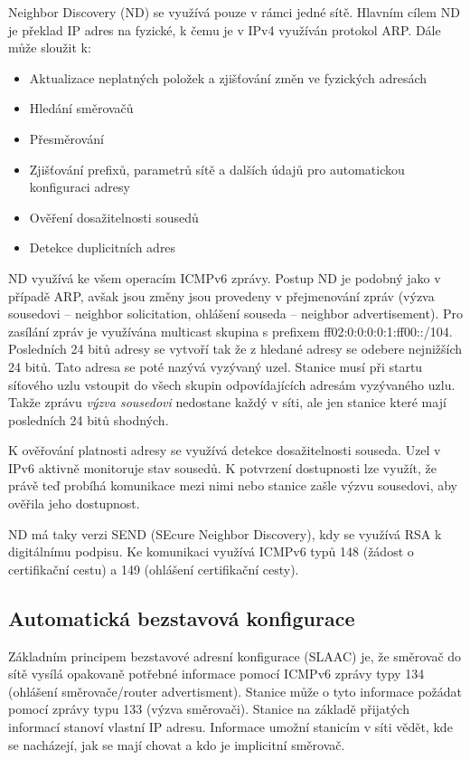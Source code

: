 Neighbor Discovery (ND) se využívá pouze v rámci jedné sítě.
Hlavním cílem ND je překlad IP adres na fyzické, k čemu je v IPv4 využíván protokol ARP.
Dále může sloužit k:
\begin{itemize}[noitemsep]
    \item Aktualizace neplatných položek a zjišťování změn ve fyzických adresách
    \item Hledání směrovačů
    \item Přesměrování
    \item Zjišťování prefixů, parametrů sítě a dalších údajů pro automatickou konfiguraci adresy
    \item Ověření dosažitelnosti sousedů
    \item Detekce duplicitních adres
\end{itemize}

ND využívá ke všem operacím ICMPv6 zprávy.
Postup ND je podobný jako v případě ARP, avšak jsou změny jsou provedeny v přejmenování zpráv (výzva sousedovi -- neighbor solicitation, ohlášení souseda -- neighbor advertisement).
Pro zasílání zpráv je využívána multicast skupina s prefixem ff02:0:0:0:0:1:ff00::/104.
Posledních 24 bitů adresy se vytvoří tak že z hledané adresy se odebere nejnižších 24 bitů.
Tato adresa se poté nazývá vyzývaný uzel.
Stanice musí při startu síťového uzlu vstoupit do všech skupin odpovídajících adresám vyzývaného uzlu.
Takže zprávu \textit{výzva sousedovi} nedostane každý v síti, ale jen stanice které mají posledních 24 bitů shodných.

K ověřování platnosti adresy se využívá detekce dosažitelnosti souseda.
Uzel v IPv6 aktivně monitoruje stav sousedů.
K potvrzení dostupnosti lze využít, že právě teď probíhá komunikace mezi nimi nebo stanice zašle výzvu sousedovi, aby ověřila jeho dostupnost.

ND má taky verzi SEND (SEcure Neighbor Discovery), kdy se využívá RSA k digitálnímu podpisu.
Ke komunikaci využívá ICMPv6 typů 148 (žádost o certifikační cestu) a 149 (ohlášení certifikační cesty).

\subsection{Automatická bezstavová konfigurace}

Základním principem bezstavové adresní konfigurace (SLAAC) je, že směrovač do sítě vysílá opakovaně potřebné informace pomocí ICMPv6 zprávy typy 134 (ohlášení směrovače/router advertisment).
Stanice může o tyto informace požádat pomocí zprávy typu 133 (výzva směrovači).
Stanice na základě přijatých informací stanoví vlastní IP adresu.
Informace umožní stanicím v síti vědět, kde se nacházejí, jak se mají chovat a kdo je implicitní směrovač.


